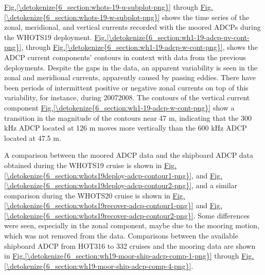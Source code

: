 \documentclass[a4paper,10pt,english,openany,oneside]{sphinxmanual}
\begin{document}
\sphinxAtStartPar
\hyperref[\detokenize{6_section:whots-19-u-subplot-png}]{Fig.\@ \ref{\detokenize{6_section:whots-19-u-subplot-png}}} through \hyperref[\detokenize{6_section:whots-19-w-subplot-png}]{Fig.\@ \ref{\detokenize{6_section:whots-19-w-subplot-png}}} shows
the time series of the zonal, meridional, and vertical currents recorded with
the moored ADCPs during the WHOTS\sphinxhyphen{}19 deployment.
\hyperref[\detokenize{6_section:wh1-19-adcp-uv-cont-png}]{Fig.\@ \ref{\detokenize{6_section:wh1-19-adcp-uv-cont-png}}}, through \hyperref[\detokenize{6_section:wh1-19-adcp-w-cont-png}]{Fig.\@ \ref{\detokenize{6_section:wh1-19-adcp-w-cont-png}}},
shows the ADCP current components’ contours in context with data from the
previous deployments. Despite the gaps in the data, an apparent variability is
seen in the zonal and meridional currents, apparently caused by passing eddies.
There have been periods of intermittent positive or negative zonal currents on
top of this variability, for instance, during 2007\sphinxhyphen{}2008. The contours of the
vertical current component \hyperref[\detokenize{6_section:wh1-19-adcp-w-cont-png}]{Fig.\@ \ref{\detokenize{6_section:wh1-19-adcp-w-cont-png}}} show a transition
in the magnitude of the contours near 47 m, indicating that the 300 kHz ADCP
located at 126 m moves more vertically than the 600 kHz ADCP located at 47.5 m.

\sphinxAtStartPar
A comparison between the moored ADCP data and the shipboard ADCP data obtained
during the WHOTS\sphinxhyphen{}19 cruise is shown in
\hyperref[\detokenize{6_section:whots19deploy-adcp-contour1-png}]{Fig.\@ \ref{\detokenize{6_section:whots19deploy-adcp-contour1-png}}}, and
\hyperref[\detokenize{6_section:whots19deploy-adcp-contour2-png}]{Fig.\@ \ref{\detokenize{6_section:whots19deploy-adcp-contour2-png}}}, and a similar comparison during the
WHOTS\sphinxhyphen{}20 cruise is shown in \hyperref[\detokenize{6_section:whots19recover-adcp-contour1-png}]{Fig.\@ \ref{\detokenize{6_section:whots19recover-adcp-contour1-png}}} and
\hyperref[\detokenize{6_section:whots19recover-adcp-contour2-png}]{Fig.\@ \ref{\detokenize{6_section:whots19recover-adcp-contour2-png}}}. Some differences were seen,
especially in the zonal component, maybe due to the mooring motion, which was
not removed from the data. Comparisons between the available shipboard ADCP
from HOT\sphinxhyphen{}316 to \sphinxhyphen{}332 cruises and the mooring data are shown in
\hyperref[\detokenize{6_section:wh19-moor-ship-adcp-comp-1-png}]{Fig.\@ \ref{\detokenize{6_section:wh19-moor-ship-adcp-comp-1-png}}} through
\hyperref[\detokenize{6_section:wh19-moor-ship-adcp-comp-4-png}]{Fig.\@ \ref{\detokenize{6_section:wh19-moor-ship-adcp-comp-4-png}}}.
\end{document}
